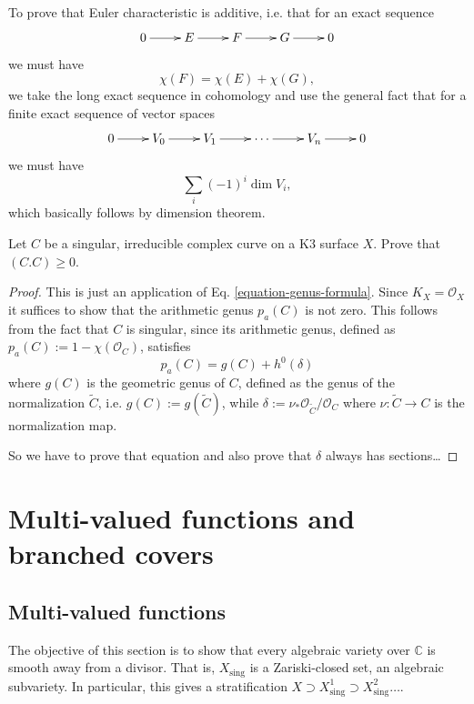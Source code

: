 \begin{remark}
\label{remark-euler-characteristic-additive}
To prove that Euler characteristic is
additive, i.e. that for an exact sequence
$$
\xymatrix{
0\ar[r]
&E\ar[r]
&F\ar[r]
&G\ar[r]
&0
}
$$
we must have
$$
\chi(F)=\chi(E)+\chi(G),
$$
we take the long exact sequence in cohomology
and use the general fact that for
a finite exact sequence of vector spaces
$$
\xymatrix{
0\ar[r]
&V_0\ar[r]
&V_1\ar[r]
&\cdots\ar[r]
&V_n\ar[r]
&0
}
$$
we must have
$$
\sum_i(-1)^i\dim V_i,
$$
which basically follows by dimension theorem.
\end{remark}

\begin{exercise}
\label{exercise-singular-curve-on-k3}
Let $C$ be a singular, irreducible complex
curve on a K3 surface $X$. Prove that
$(C.C)\geq 0$.
\end{exercise}

\begin{proof}
This is just an application of Eq.
\ref{equation-genus-formula}. Since
$K_X=\mathcal{O}_X$ it suffices to show that
the arithmetic genus
$p_a(C)$ is not zero. This follows from the
fact that $C$ is singular, since its
arithmetic genus, defined as 
$p_a(C):=1-\chi(\mathcal{O}_C)$,
satisfies
$$
p_a(C)=g(C) + h^0(\delta)
$$
where $g(C)$ is the geometric genus of $C$,
defined as
the genus of the normalization $\tilde{C}$,
i.e. $g(C):=g(\tilde{C})$,
while $\delta:=\nu_*\mathcal{O}_{\tilde{C}}
/\mathcal{O}_C$
where $\nu:\tilde{C} \to C$ is the
normalization map.

So we have to prove that equation
and also prove that $\delta$
always has sections…
\end{proof}

\section{Multi-valued functions and branched covers}
\label{section-multi-valued-functions-and-branched-covers}

\subsection{Multi-valued functions}
\label{subsection-multi-valued-functions}

\noindent
The objective of this section is to
show that every algebraic variety
over $\mathbb{C}$ is smooth
away from a divisor.
That is, $X_{\text{sing}}$
is a Zariski-closed set, an algebraic
subvariety.
In particular, this gives a stratification
$X\supset X^1_{\text{sing}}
\supset X^2_{\text{sing}}…$.

